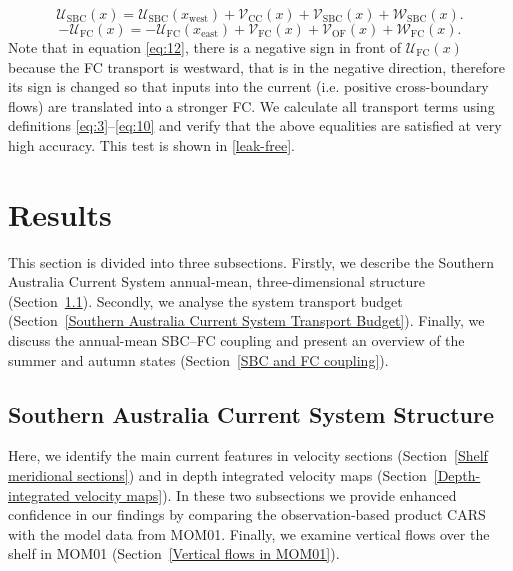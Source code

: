 \documentclass[preprint,3p,review,12pt]{elsarticle}
\newcommand{\sub}[1]{_{\text{#1}}}
\begin{document}
\begin{equation} \label{eq:11}
\mathcal{U}\sub{SBC}(x) = \mathcal{U}\sub{SBC}(x\sub{west}) + \mathcal{V}\sub{CC}(x) + \mathcal{V}\sub{SBC}(x) + \mathcal{W}\sub{SBC}(x).
\end{equation}
%
\begin{equation} \label{eq:12}
-\mathcal{U}\sub{FC}(x) = -\mathcal{U}\sub{FC}(x\sub{east}) + \mathcal{V}\sub{FC}(x) + \mathcal{V}\sub{OF}(x) + \mathcal{W}\sub{FC}(x).
\end{equation}
%
Note that in equation \ref{eq:12}, there is a negative sign in front of $\mathcal{U}\sub{FC}(x)$ because the FC transport is westward, that is in the negative direction, therefore its sign is changed so that inputs into the current (i.e. positive cross-boundary flows) are translated into a stronger FC. We calculate all transport terms using definitions \ref{eq:3}--\ref{eq:10} and verify that the above equalities are satisfied at very high accuracy. This test is shown in \ref{leak-free}.

\section{Results} \label{Results and Discussion}
This section is divided into three subsections. Firstly, we describe the Southern Australia Current System annual-mean, three-dimensional structure (Section~\ref{Southern Australia Current System Structure}). Secondly, we analyse the system transport budget (Section~\ref{Southern Australia Current System Transport Budget}). Finally, we discuss the annual-mean SBC--FC coupling and present an overview of the summer and autumn states (Section~\ref{SBC and FC coupling}).

\subsection{Southern Australia Current System Structure} \label{Southern Australia Current System Structure}
Here, we identify the main current features in velocity sections (Section~\ref{Shelf meridional sections}) and in depth integrated velocity maps (Section~\ref{Depth-integrated velocity maps}). In these two subsections we provide enhanced confidence in our findings by comparing the observation-based product CARS with the model data from MOM01. Finally, we examine vertical flows over the shelf in MOM01 (Section~\ref{Vertical flows in MOM01}).
\end{document}
